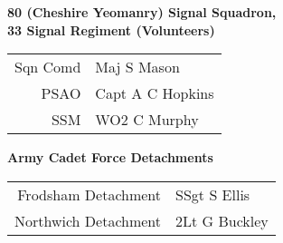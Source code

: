 \vspace*{10mm}

\pagebreak

\begin{center}
  \Large
  \textbf{80 (Cheshire Yeomanry) Signal Squadron, \\ 33 Signal Regiment (Volunteers)}
\end{center}

\begin{center}
  \begin{tabular}{rl}
    Sqn Comd & Maj S Mason \\
    PSAO & Capt A C Hopkins \\
    SSM & WO2 C Murphy \\
  \end{tabular}
\end{center}

\vspace*{10mm}

\begin{center}
  \Large
  \textbf{Army Cadet Force Detachments}
\end{center}

\begin{center}
  \begin{tabular}{rl}
    Frodsham Detachment & SSgt S Ellis \\
    Northwich Detachment & 2Lt G Buckley \\
  \end{tabular}
\end{center}

